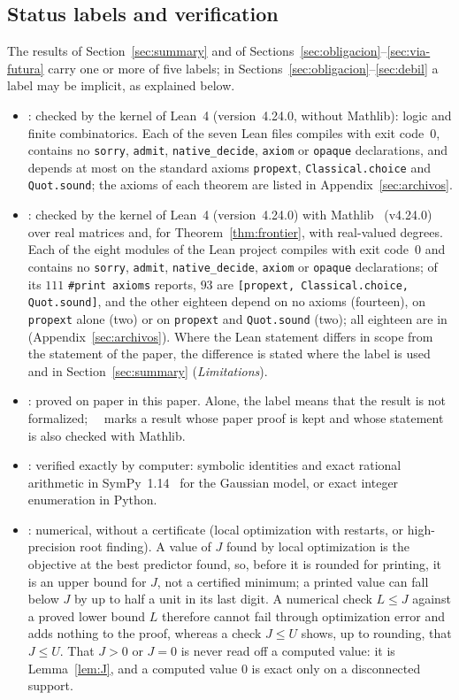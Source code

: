 \subsection{Status labels and verification}\label{sec:status}
The results of Section~\ref{sec:summary} and of Sections~\ref{sec:obligacion}--\ref{sec:via-futura} carry one or more of five labels; in Sections~\ref{sec:obligacion}--\ref{sec:debil} a label may be implicit, as explained below.
\begin{itemize}
\item \stL: checked by the kernel of Lean~4 (version~4.24.0, without Mathlib): logic and finite combinatorics. Each of the seven Lean files compiles with exit code~0, contains no \texttt{sorry}, \texttt{admit}, \texttt{native\_decide}, \texttt{axiom} or \texttt{opaque} declarations, and depends at most on the standard axioms \texttt{propext}, \texttt{Classical.choice} and \texttt{Quot.sound}; the axioms of each theorem are listed in Appendix~\ref{sec:archivos}.
\item \stM: checked by the kernel of Lean~4 (version~4.24.0) with Mathlib~\cite{Mathlib2020} (v4.24.0) over real matrices and, for Theorem~\ref{thm:frontier}, with real-valued degrees. Each of the eight modules of the Lean project compiles with exit code~0 and contains no \texttt{sorry}, \texttt{admit}, \texttt{native\_decide}, \texttt{axiom} or \texttt{opaque} declarations; of its $111$ \texttt{\#print axioms} reports, $93$ are \texttt{[propext, Classical.choice, Quot.sound]}, and the other eighteen depend on no axioms (fourteen), on \texttt{propext} alone (two) or on \texttt{propext} and \texttt{Quot.sound} (two); all eighteen are in  (Appendix~\ref{sec:archivos}). Where the Lean statement differs in scope from the statement of the paper, the difference is stated where the label is used and in Section~\ref{sec:summary} (\emph{Limitations}).
\item \stA: proved on paper in this paper. Alone, the label means that the result is not formalized; \stA\ \stM\ marks a result whose paper proof is kept and whose statement is also checked with Mathlib.
\item \stS: verified exactly by computer: symbolic identities and exact rational arithmetic in SymPy~1.14~\cite{SymPy2017} for the Gaussian model, or exact integer enumeration in Python.
\item \stN: numerical, without a certificate (local optimization with restarts, or high-precision root finding). A value of $J$ found by local optimization is the objective at the best predictor found, so, before it is rounded for printing, it is an upper bound for $J$, not a certified minimum; a printed value can fall below $J$ by up to half a unit in its last digit. A numerical check $L\le J$ against a proved lower bound $L$ therefore cannot fail through optimization error and adds nothing to the proof, whereas a check $J\le U$ shows, up to rounding, that $J\le U$. That $J>0$ or $J=0$ is never read off a computed value: it is Lemma~\ref{lem:J}, and a computed value $0$ is exact only on a disconnected support.
\end{itemize}
